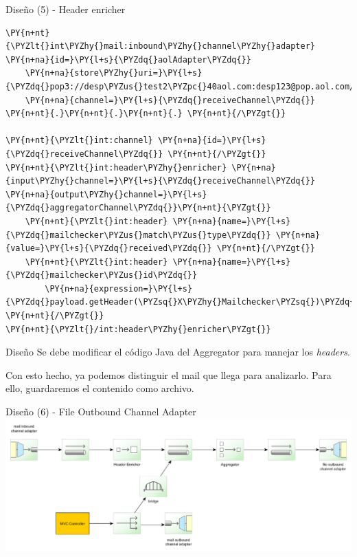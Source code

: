 \documentclass{beamer}
\begin{document}
\begin{frame}[fragile]{Diseño (5) - Header enricher}
\begin{Verbatim}[fontsize=\tiny,commandchars=\\\{\}]
\PY{n+nt}{\PYZlt{}int\PYZhy{}mail:inbound\PYZhy{}channel\PYZhy{}adapter} \PY{n+na}{id=}\PY{l+s}{\PYZdq{}aolAdapter\PYZdq{}}
    \PY{n+na}{store\PYZhy{}uri=}\PY{l+s}{\PYZdq{}pop3://desp\PYZus{}test2\PYZpc{}40aol.com:desp123@pop.aol.com/INBOX\PYZdq{}}
    \PY{n+na}{channel=}\PY{l+s}{\PYZdq{}receiveChannel\PYZdq{}} \PY{n+nt}{.}\PY{n+nt}{.}\PY{n+nt}{.} \PY{n+nt}{/\PYZgt{}}

\PY{n+nt}{\PYZlt{}int:channel} \PY{n+na}{id=}\PY{l+s}{\PYZdq{}receiveChannel\PYZdq{}} \PY{n+nt}{/\PYZgt{}}
\PY{n+nt}{\PYZlt{}int:header\PYZhy{}enricher} \PY{n+na}{input\PYZhy{}channel=}\PY{l+s}{\PYZdq{}receiveChannel\PYZdq{}} \PY{n+na}{output\PYZhy{}channel=}\PY{l+s}{\PYZdq{}aggregatorChannel\PYZdq{}}\PY{n+nt}{\PYZgt{}}
    \PY{n+nt}{\PYZlt{}int:header} \PY{n+na}{name=}\PY{l+s}{\PYZdq{}mailchecker\PYZus{}match\PYZus{}type\PYZdq{}} \PY{n+na}{value=}\PY{l+s}{\PYZdq{}received\PYZdq{}} \PY{n+nt}{/\PYZgt{}}
    \PY{n+nt}{\PYZlt{}int:header} \PY{n+na}{name=}\PY{l+s}{\PYZdq{}mailchecker\PYZus{}id\PYZdq{}} 
        \PY{n+na}{expression=}\PY{l+s}{\PYZdq{}payload.getHeader(\PYZsq{}X\PYZhy{}Mailchecker\PYZsq{})\PYZdq{}} \PY{n+nt}{/\PYZgt{}}
\PY{n+nt}{\PYZlt{}/int:header\PYZhy{}enricher\PYZgt{}}
\end{Verbatim}
\end{frame}

\begin{frame}{Diseño}
Se debe modificar el código Java del Aggregator para manejar los \textit{headers}. \pause

Con esto hecho, ya podemos distinguir el mail que llega para analizarlo.
Para ello, guardaremos el contenido como archivo.
\end{frame}

\begin{frame}{Diseño (6) - File Outbound Channel Adapter}
\includegraphics[width=1.0\linewidth]{sp-int-08}
\end{frame}
\end{document}
